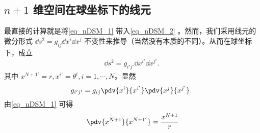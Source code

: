 \subsection{$n+1$ 维空间在球坐标下的线元}
最直接的计算就是将\autoref{eq_nDSM_1} 带入\autoref{eq_nDSM_2} 。然而，我们采用线元的微分形式 $\dd s^2=g_{ij}\dd x^i\dd x^j$ 不变性来推导（当然没有本质的不同）。从而在球坐标下，成立
\begin{equation}
\begin{aligned}
\dd s^2= g_{i'j'}\dd x^{i'}\dd x^{j'}.
\end{aligned}~
\end{equation}
其中 $x^{N+1'}=r,x^{i'}=\theta^i,i=1,\cdots,N$。显然
\begin{equation}
g_{i'j'}=g_{ij}\pdv{x^i}{x^{i'}}\pdv{x^j}{x^{j'}}.~
\end{equation}
由\autoref{eq_nDSM_1} 可得
\begin{equation}
\begin{aligned}
\pdv{x^{N+1}}{x^{N+1'}}=\frac{x^{N+1}}{r}
\end{aligned}
\end{equation}



























